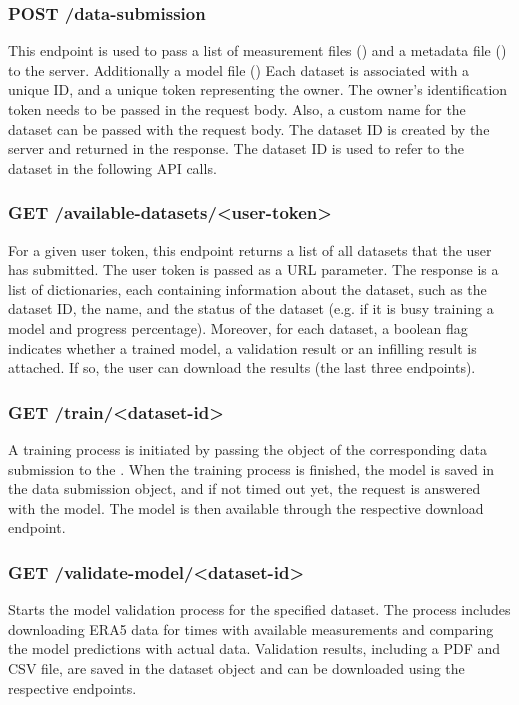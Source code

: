 \subsubsection*{POST /data-submission}

This endpoint is used to pass a list of measurement files () and a metadata file () to the server. Additionally a model file () 
Each dataset is associated with a unique ID, and a unique token representing the owner.
The owner's identification token needs to be passed in the request body.
Also, a custom name for the dataset can be passed with the request body.
The dataset ID is created by the server and returned in the response.
The dataset ID is used to refer to the dataset in the following API calls.

\subsubsection*{GET /available-datasets/<user-token>}

For a given user token, this endpoint returns a list of all datasets that the user has submitted.
The user token is passed as a URL parameter.
The response is a list of dictionaries, each containing information about the dataset, such as the dataset ID, the name, and the status of the dataset (e.g. if it is busy training a model and progress percentage).
Moreover, for each dataset, a boolean flag indicates whether a trained model, a validation result or an infilling result is attached. If so, the user can download the results (the last three endpoints).

\subsubsection*{GET /train/<dataset-id>}

A training process is initiated by passing the  object of the corresponding data submission to the .
When the training process is finished, the model is saved in the data submission object, and if not timed out yet, the request is answered with the model.
The model is then available through the respective download endpoint.

\subsubsection*{GET /validate-model/<dataset-id>}

Starts the model validation process for the specified dataset.
The process includes downloading ERA5 data for times with available measurements and comparing the model predictions with actual data.
Validation results, including a PDF and CSV file, are saved in the dataset object and can be downloaded using the respective endpoints.


